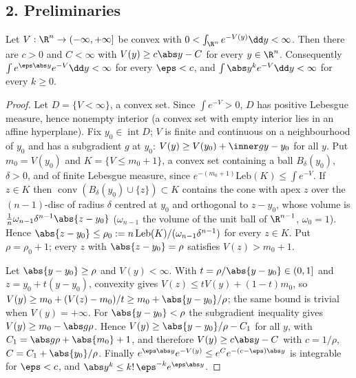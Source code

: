 \documentclass[../main.tex]{subfiles}
\begin{document}
\subsection*{2. Preliminaries}

\begin{lemma}
\label{lem:sol-lstm-linear-growth}
Let $V:\R^n\to(-\infty,+\infty]$ be convex with $0<\int_{\R^n}e^{-V(y)}\dd y<\infty$.  Then
there are $c>0$ and $C<\infty$ with $V(y)\ge c\abs y-C$ for every $y\in\R^n$.  Consequently
$\int e^{\eps\abs y}e^{-V}\dd y<\infty$ for every $\eps<c$, and $\int\abs y^ke^{-V}\dd y<\infty$
for every $k\ge0$.
\end{lemma}

\begin{proof}
Let $D=\{V<\infty\}$, a convex set.  Since $\int e^{-V}>0$, $D$ has positive Lebesgue
measure, hence nonempty interior (a convex set with empty interior lies in an affine
hyperplane).  Fix $y_0\in\operatorname{int}D$; $V$ is finite and continuous on a
neighbourhood of $y_0$ and has a subgradient $g$ at $y_0$:
$V(y)\ge V(y_0)+\inner g{y-y_0}$ for all $y$.  Put $m_0=V(y_0)$ and $K=\{V\le m_0+1\}$, a
convex set containing a ball $B_\delta(y_0)$, $\delta>0$, and of finite Lebesgue measure,
since $e^{-(m_0+1)}\mathrm{Leb}(K)\le\int e^{-V}$.  If $z\in K$ then
$\operatorname{conv}(B_\delta(y_0)\cup\{z\})\subset K$ contains the cone with apex $z$ over the
$(n-1)$-disc of radius $\delta$ centred at $y_0$ and orthogonal to $z-y_0$, whose volume is
$\frac1n\omega_{n-1}\delta^{n-1}\abs{z-y_0}$ ($\omega_{n-1}$ the volume of the unit ball of
$\R^{n-1}$, $\omega_0=1$).  Hence $\abs{z-y_0}\le\rho_0:=n\,\mathrm{Leb}(K)/(\omega_{n-1}\delta^{n-1})$
for every $z\in K$.  Put $\rho=\rho_0+1$; every $z$ with $\abs{z-y_0}=\rho$ satisfies
$V(z)>m_0+1$.

Let $\abs{y-y_0}\ge\rho$ and $V(y)<\infty$.  With $t=\rho/\abs{y-y_0}\in(0,1]$ and
$z=y_0+t(y-y_0)$, convexity gives $V(z)\le tV(y)+(1-t)m_0$, so
$V(y)\ge m_0+(V(z)-m_0)/t\ge m_0+\abs{y-y_0}/\rho$; the same bound is trivial when
$V(y)=+\infty$.  For $\abs{y-y_0}<\rho$ the subgradient inequality gives
$V(y)\ge m_0-\abs g\rho$.  Hence $V(y)\ge\abs{y-y_0}/\rho-C_1$ for all $y$, with
$C_1=\abs g\rho+\abs{m_0}+1$, and therefore $V(y)\ge c\abs y-C$ with $c=1/\rho$,
$C=C_1+\abs{y_0}/\rho$.  Finally $e^{\eps\abs y}e^{-V(y)}\le e^{C}e^{-(c-\eps)\abs y}$ is
integrable for $\eps<c$, and $\abs y^k\le k!\,\eps^{-k}e^{\eps\abs y}$.
\end{proof}
\end{document}
